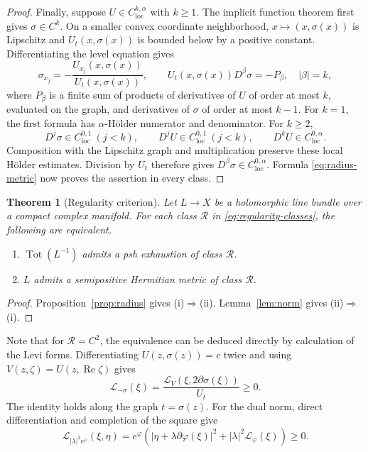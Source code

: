 \documentclass[11pt]{amsart}
\newtheorem{theorem}{Theorem}[section]
\theoremstyle{definition}
\theoremstyle{remark}
\numberwithin{equation}{section}
\newcommand{\Tot}{\operatorname{Tot}}
\newcommand{\Levi}{\mathcal L}
\begin{document}
\begin{proof}
Finally, suppose $U\in C^{k,\alpha}_{\mathrm{loc}}$ with $k\ge1$.
The implicit function theorem first gives $\sigma\in C^k$. On a smaller
convex coordinate neighborhood, $x\mapsto(x,\sigma(x))$ is
Lipschitz and $U_t(x,\sigma(x))$ is bounded below by a positive
constant. Differentiating the level equation gives
\[
 \sigma_{x_j}=-\frac{U_{x_j}(x,\sigma(x))}{U_t(x,\sigma(x))},
 \qquad
 U_t(x,\sigma(x))D^\beta\sigma=-P_\beta,
 \quad |\beta|=k,
\]
where $P_\beta$ is a finite sum of products of derivatives of $U$
of order at most $k$, evaluated on the graph, and derivatives of
$\sigma$ of order at most $k-1$. For $k=1$, the first formula
has $\alpha$-H\"older numerator and denominator. For $k\ge2$,
\[
 D^j\sigma\in C^{0,1}_{\mathrm{loc}}\ (j<k),\qquad
 D^jU\in C^{0,1}_{\mathrm{loc}}\ (j<k),\qquad
 D^kU\in C^{0,\alpha}_{\mathrm{loc}}.
\]
Composition with the Lipschitz graph and multiplication preserve
these local H\"older estimates. Division by $U_t$ therefore gives
$D^\beta\sigma\in C^{0,\alpha}_{\mathrm{loc}}$. Formula
\eqref{eq:radius-metric} now proves the
assertion in every class.
\end{proof}

\begin{samepage}
\begin{theorem}[Regularity criterion]\label{cor:criterion}\label{thm:regularity-criterion}
Let $L\to X$ be a holomorphic line bundle over a compact complex
manifold. For each class $\mathcal R$ in
\eqref{eq:regularity-classes}, the following are equivalent.
\begin{enumerate}[label=\textup{(\roman*)},leftmargin=2.5em]
\item $\Tot(L^{-1})$ admits a psh exhaustion of class $\mathcal R$.
\item $L$ admits a semipositive Hermitian metric of class $\mathcal R$.
\end{enumerate}
\end{theorem}
\begin{proof}
Proposition~\ref{prop:radius} gives \textup{(i)}$\Rightarrow$\textup{(ii)}.
Lemma~\ref{lem:norm} gives \textup{(ii)}$\Rightarrow$\textup{(i)}.
\end{proof}
\end{samepage}

Note that for $\mathcal R=C^2$, the equivalence can be deduced directly by calculation of the Levi forms.
Differentiating $U(z,\sigma(z))=c$ twice and using
$V(z,\zeta)=U(z,\operatorname{Re}\zeta)$ gives
\begin{equation}\label{eq:radius-Levi}
 \Levi_{-\sigma}(\xi)
 =\frac{\Levi_V(\xi,2\partial\sigma(\xi))}{U_t}\ge0.
\end{equation}
The identity holds along the graph $t=\sigma(z)$.
For the dual norm, direct differentiation and completion of the
square give
\[
 \Levi_{|\lambda|^2e^\varphi}(\xi,\eta)
 =e^\varphi\left(
    |\eta+\lambda\partial\varphi(\xi)|^2
    +|\lambda|^2\Levi_\varphi(\xi)\right)\ge0.
\]
\end{document}

